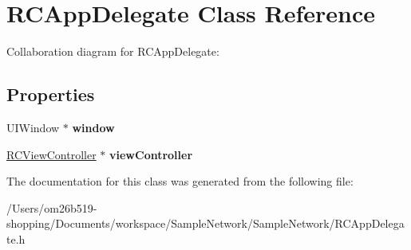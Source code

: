 \hypertarget{interface_r_c_app_delegate}{\section{R\-C\-App\-Delegate Class Reference}
\label{interface_r_c_app_delegate}
}


Collaboration diagram for R\-C\-App\-Delegate\-:
\subsection*{Properties}
\begin{DoxyCompactItemize}
\item 
\hypertarget{interface_r_c_app_delegate_a1cb166c772e75ddfc4df28c1f2ec2a2c}{U\-I\-Window $\ast$ {\bfseries window}}\label{interface_r_c_app_delegate_a1cb166c772e75ddfc4df28c1f2ec2a2c}

\item 
\hypertarget{interface_r_c_app_delegate_a76a602f82eb36a6035375acfaf7750d6}{\hyperlink{interface_r_c_view_controller}{R\-C\-View\-Controller} $\ast$ {\bfseries view\-Controller}}\label{interface_r_c_app_delegate_a76a602f82eb36a6035375acfaf7750d6}

\end{DoxyCompactItemize}


The documentation for this class was generated from the following file\-:\begin{DoxyCompactItemize}
\item 
/\-Users/om26b519-\/shopping/\-Documents/workspace/\-Sample\-Network/\-Sample\-Network/R\-C\-App\-Delegate.\-h\end{DoxyCompactItemize}
